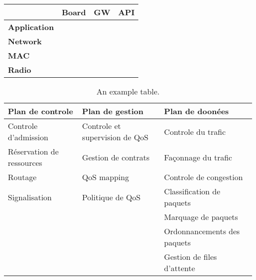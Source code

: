 \begin{table}[h!]
\centering
\scriptsize
	\begin{tabulary}{\textwidth}{L|L|L|L}
	\                    & \textbf{Board}  & \textbf{GW} & \textbf{API}  \\\hline
	\textbf{Application} &                 &             &               \\\hline
	\textbf{Network}     &                 &             &               \\\hline
	\textbf{MAC}         &                 &             &               \\\hline
	\textbf{Radio}       &                 &             &               \\\hline
	\end{tabulary}
\caption{\label{tab:ygxps} }
\end{table}


\begin{table}[h!]
\scriptsize
	\begin{tabulary}{\textwidth}{L|L|L}
		\textbf{Plan de controle}   & \textbf{Plan de gestion}   & 	\textbf{Plan de doonées}  \\\hline
	Controle d'admission      & Controle et supervision de QoS & Controle du trafic         \\
	Réservation de ressources & Gestion de contrats            & Façonnage du trafic        \\
	Routage                   & QoS mapping                    & Controle de congestion     \\
	Signalisation             & Politique de QoS               & Classification de paquets  \\
	\                         &                                & Marquage de paquets        \\
	\                         &                                & Ordonnancements des paquets\\
	\                         &                                & Gestion de files d'attente \\
	\end{tabulary}
	\caption{\label{tab:qos} An example table.}
\end{table}

